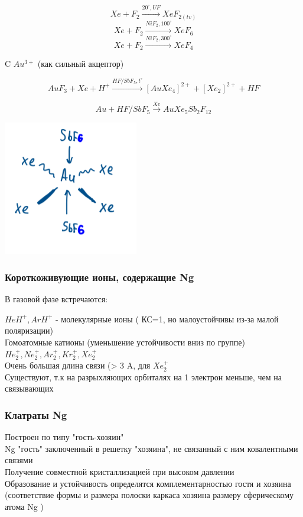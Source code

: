 \documentclass[14pt,a4paper]{scrartcl}
\begin{document}
$$Xe + F_2 \xrightarrow{20^{\circ}, UF} XeF_{2(tv)}$$
$$Xe + F_2 \xrightarrow{NiF_2, 100^{\circ}} XeF_6$$
$$Xe + F_2 \xrightarrow{NiF_2, 300^{\circ}}XeF_4$$

C $Au^{3+}$ (как сильный акцептор)

$$AuF_3 + Xe + H^+ \xrightarrow{HF/SbF_5, t^{\circ}} [AuXe_4]^{2+} + [Xe_2]^{2+} + HF$$

$$Au + HF/SbF_5 \xrightarrow{Xe} AuXe_5Sb_2F_{12}$$ 

\includegraphics[scale=0.8]{13v1.png}

\subsubsection{Короткоживующие ионы, содержащие Ng}

В газовой фазе встречаются:

$HeH^+, ArH^+$ - молекулярные ионы ( КС=1, но малоустойчивы из-за малой поляризации)\\
Гомоатомные катионы (уменьшение устойчивости вниз по группе)
$He_2^+, Ne_2^+, Ar_2^+, Kr_2^+, Xe_2^+$\\
Очень большая длина связи (> 3 A,  для $Xe_2^+$\\
Существуют, т.к на разрыхляющих орбиталях на 1 электрон меньше, чем на связывающих

\subsubsection{Клатраты Ng}

Построен по типу "гость-хозяин"\\
Ng "гость" заключенный в решетку "хозяина", не связанный с ним ковалентными связями\\
Получение совместной кристаллизацией при высоком давлении\\
Образование и устойчивость определятся комплементарностью гостя и хозяина (соответствие формы и размера полоски каркаса хозяина размеру сферическому атома Ng )
\end{document}
